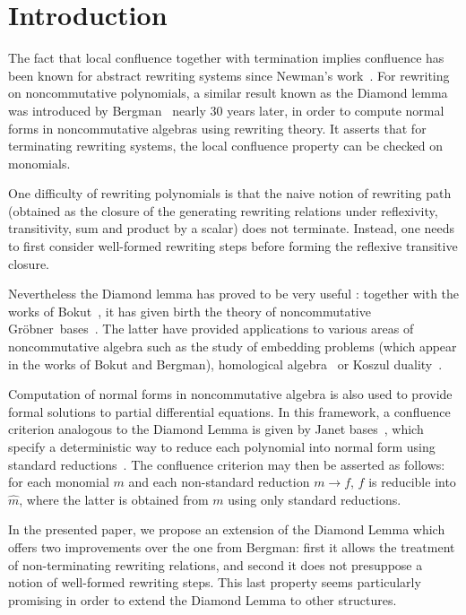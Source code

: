 \documentclass[10pt]{easychair}
\theoremstyle{definition}
\newcommand\G{Gröbner}
\begin{document}
\section{Introduction}

The fact that local confluence together with termination implies
confluence has been known for abstract rewriting systems since
Newman's work~\cite{MR0007372}. For rewriting on noncommutative
polynomials, a similar result known as the Diamond lemma was
introduced by Bergman~\cite{MR506890} nearly 30 years later, in order
to compute normal forms in noncommutative algebras using rewriting
theory. It asserts that for terminating rewriting systems, the local
confluence property can be checked on monomials.

One difficulty of rewriting polynomials is that the naive notion of
rewriting path (obtained as the closure of the generating rewriting
relations under reflexivity, transitivity, sum and product by a
scalar) does not terminate. Instead, one needs to first consider
well-formed rewriting steps before forming the reflexive transitive
closure.

Nevertheless the Diamond lemma has proved to be very useful : together
with the works of Bokut~\cite{MR0506423}, it has given birth the
theory of noncommutative \G\ bases~\cite{MR1299371}. The latter have
provided applications to various areas of noncommutative algebra such
as the study of embedding problems (which appear in the works of Bokut
and Bergman), homological algebra~\cite{MR1072284, MR2110434} or
Koszul duality~\cite{MR1832913, MR0265437}.

Computation of normal forms in noncommutative algebra is also used to
provide formal solutions to partial differential equations. In this
framework, a confluence criterion analogous to the Diamond Lemma is
given by Janet bases~\cite{MR2394773}, which specify a deterministic
way to reduce each polynomial into normal form using standard
reductions~\cite{Mell}. The confluence criterion may then be asserted
as follows: for each monomial $m$ and each non-standard reduction
$m\to f$, $f$ is reducible into $\widehat{m}$, where the latter is
obtained from $m$ using only standard reductions.

In the presented paper, we propose an extension of the Diamond Lemma
which offers two improvements over the one from Bergman: first it
allows the treatment of non-terminating rewriting relations, and
second it does not presuppose a notion of well-formed rewriting
steps. This last property seems particularly promising in order to
extend the Diamond Lemma to other structures.
\end{document}
